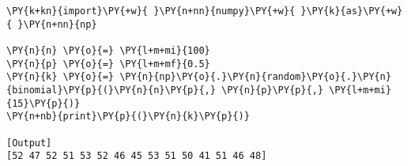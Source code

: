 \begin{Verbatim}[label=\makebox{\href{https://github.com/unipi-physics-labs/lab1-notes/tree/main/snippy/np.random.binomial.py}{https://github.com/.../np.random.binomial.py}},commandchars=\\\{\}]
\PY{k+kn}{import}\PY{+w}{ }\PY{n+nn}{numpy}\PY{+w}{ }\PY{k}{as}\PY{+w}{ }\PY{n+nn}{np}

\PY{n}{n} \PY{o}{=} \PY{l+m+mi}{100}
\PY{n}{p} \PY{o}{=} \PY{l+m+mf}{0.5}
\PY{n}{k} \PY{o}{=} \PY{n}{np}\PY{o}{.}\PY{n}{random}\PY{o}{.}\PY{n}{binomial}\PY{p}{(}\PY{n}{n}\PY{p}{,} \PY{n}{p}\PY{p}{,} \PY{l+m+mi}{15}\PY{p}{)}
\PY{n+nb}{print}\PY{p}{(}\PY{n}{k}\PY{p}{)}

[Output]
[52 47 52 51 53 52 46 45 53 51 50 41 51 46 48]
\end{Verbatim}
